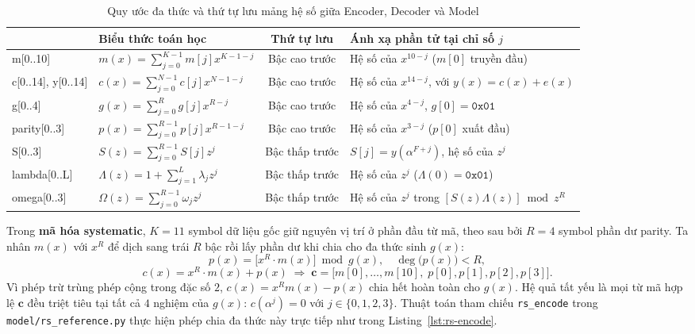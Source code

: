 \documentclass[12pt,a4paper]{report}
\begin{document}
\begin{table}[!htb]
    \centering
    \caption{Quy ước đa thức và thứ tự lưu mảng hệ số giữa Encoder, Decoder và Model}
    \label{tab:poly-order}
    \small
    \begin{tabularx}{\textwidth}{@{}>{\ttfamily}l l c X@{}}
        \toprule
        \multicolumn{1}{@{}l}{\textbf{Mảng / Đa thức}} & \textbf{Biểu thức toán học} & \textbf{Thứ tự lưu} & \textbf{Ánh xạ phần tử tại chỉ số $j$} \\
        \midrule
        m[0..10] & $m(x) = \sum_{j=0}^{K-1} m[j] x^{K-1-j}$ & Bậc cao trước & Hệ số của $x^{10-j}$ ($m[0]$ truyền đầu) \\
        c[0..14], y[0..14] & $c(x) = \sum_{j=0}^{N-1} c[j] x^{N-1-j}$ & Bậc cao trước & Hệ số của $x^{14-j}$, với $y(x) = c(x) + e(x)$ \\
        g[0..4] & $g(x) = \sum_{j=0}^{R} g[j] x^{R-j}$ & Bậc cao trước & Hệ số của $x^{4-j}$, $g[0] = \texttt{0x01}$ \\
        parity[0..3] & $p(x) = \sum_{j=0}^{R-1} p[j] x^{R-1-j}$ & Bậc cao trước & Hệ số của $x^{3-j}$ ($p[0]$ xuất đầu) \\
        S[0..3] & $S(z) = \sum_{j=0}^{R-1} S[j] z^j$ & Bậc thấp trước & $S[j] = y(\alpha^{F+j})$, hệ số của $z^j$ \\
        lambda[0..L] & $\Lambda(z) = 1 + \sum_{j=1}^{L} \lambda_j z^j$ & Bậc thấp trước & Hệ số của $z^j$ ($\Lambda(0) = \texttt{0x01}$) \\
        omega[0..3] & $\Omega(z) = \sum_{j=0}^{R-1} \omega_j z^j$ & Bậc thấp trước & Hệ số của $z^j$ trong $[S(z)\Lambda(z)] \bmod z^R$ \\
        \bottomrule
    \end{tabularx}
\end{table}

Trong \textbf{mã hóa systematic}, $K = 11$ symbol dữ liệu gốc giữ nguyên vị trí ở phần đầu từ mã, theo sau bởi $R = 4$ symbol phần dư parity. Ta nhân $m(x)$ với $x^R$ để dịch sang trái $R$ bậc rồi lấy phần dư khi chia cho đa thức sinh $g(x)$:
\begin{equation}
    p(x) = \bigl[x^R \cdot m(x)\bigr] \bmod g(x), \quad \deg\bigl(p(x)\bigr) < R,
    \label{eq:parity-rem}
\end{equation}
\begin{equation}
    c(x) = x^R \cdot m(x) + p(x) \;\Longrightarrow\; \mathbf{c} = \bigl[m[0], \dots, m[10],\; p[0], p[1], p[2], p[3]\bigr].
    \label{eq:sys-codeword}
\end{equation}
Vì phép trừ trùng phép cộng trong đặc số $2$, $c(x) = x^R m(x) - p(x)$ chia hết hoàn toàn cho $g(x)$. Hệ quả tất yếu là mọi từ mã hợp lệ $\mathbf{c}$ đều triệt tiêu tại tất cả $4$ nghiệm của $g(x)$: $c(\alpha^j) = 0$ với $j \in \{0, 1, 2, 3\}$. Thuật toán tham chiếu \texttt{rs\_encode} trong \texttt{model/rs\_reference.py} thực hiện phép chia đa thức này trực tiếp như trong Listing~\ref{lst:rs-encode}.
\end{document}

